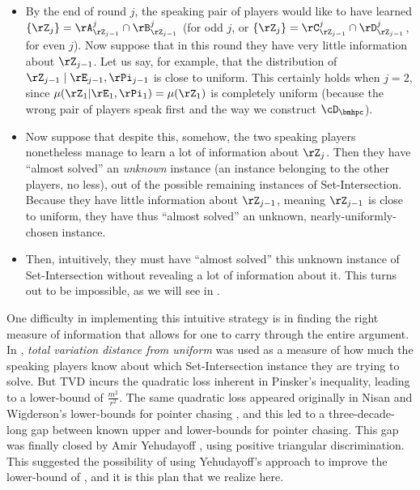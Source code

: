 \begin{itemize}
  \item
      By the end of round $j$, the speaking pair of players would like to
      have learned $\{\rZ_{j} \} = \rA^j_{\rZ_{j-1}} \cap \rB^j_{\rZ_{j-1}}$
      (for odd $j$, or $\{\rZ_{j} \} = \rC^j_{\rZ_{j-1}} \cap \rD^j_{\rZ_{j-1}}$,
      for even $j$).
      Now suppose that in this round they have very little information about
      $\rZ_{j-1}$.
      Let us say, for example, that the distribution of
      $\rZ_{j-1} \mid \rE_{j-1}, \rPi_{j-1}$ is close to uniform.
      This certainly holds when $j = 2$, since
      $\mu(\rZ_1 | \rE_1, \rPi_1) = \mu(\rZ_1)$ is
      completely uniform (because the wrong pair of players speak first and the
      way we construct $\cD_\bmhpc$).
    


  \item Now suppose that despite this, somehow, the two speaking players
    nonetheless manage to learn a lot of information about $\rZ_{j}$. Then they
    have ``almost solved'' an \textit{unknown} instance (an instance belonging
    to the other players, no less), out of the possible remaining instances of
    Set-Intersection.
    Because they have little information about $\rZ_{j-1}$,
    meaning $\rZ_{j-1}$ is close to uniform, they have thus ``almost solved'' an
    unknown, nearly-uniformly-chosen instance. 

  \item Then, intuitively, they must have ``almost solved'' this unknown instance of Set-Intersection without revealing a lot of information about it. This turns out to be impossible, as we will see in . 
\end{itemize}


One difficulty in implementing this intuitive strategy is in finding the right measure of information that allows for one to carry through the entire argument. In \cite{AssadiCK19}, \textit{total variation distance from uniform} was used as a measure of how much the speaking players know about which Set-Intersection instance they are trying to solve. But TVD incurs the quadratic loss inherent in Pinsker's inequality, leading to a lower-bound of $\frac{m^2}{r^2}$. The same quadratic loss appeared originally in Nisan and Wigderson's lower-bounds for pointer chasing \cite{NisanW93}, and this led to a three-decade-long gap between known upper and lower-bounds for pointer chasing. This gap was finally closed by Amir Yehudayoff \cite{Yehudayoff20}, using positive triangular discrimination. This suggested the possibility of using Yehudayoff's approach to improve the lower-bound of \cite{AssadiCK19}, and it is this plan that we realize here.

